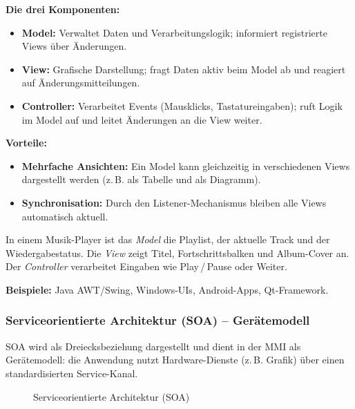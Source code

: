 \documentclass[12pt, a4paper]{article}
\begin{document}
\textbf{Die drei Komponenten:}
\begin{itemize}
  \item \textbf{Model:} Verwaltet Daten und Verarbeitungslogik; informiert
        registrierte Views über Änderungen.
  \item \textbf{View:} Grafische Darstellung; fragt Daten aktiv beim Model ab
        und reagiert auf Änderungsmitteilungen.
  \item \textbf{Controller:} Verarbeitet Events (Mausklicks, Tastatureingaben);
        ruft Logik im Model auf und leitet Änderungen an die View weiter.
\end{itemize}

\textbf{Vorteile:}
\begin{itemize}
  \item \textbf{Mehrfache Ansichten:} Ein Model kann gleichzeitig in verschiedenen
        Views dargestellt werden (z.\,B. als Tabelle und als Diagramm).
  \item \textbf{Synchronisation:} Durch den Listener-Mechanismus bleiben alle
        Views automatisch aktuell.
\end{itemize}

\begin{examplebox}
  In einem Musik-Player ist das \textit{Model} die Playlist, der aktuelle Track und
  der Wiedergabestatus. Die \textit{View} zeigt Titel, Fortschrittsbalken und
  Album-Cover an. Der \textit{Controller} verarbeitet Eingaben wie Play\,/\,Pause
  oder Weiter.
\end{examplebox}

\textbf{Beispiele:} Java AWT/Swing, Windows-UIs, Android-Apps, Qt-Framework.

\subsubsection{Serviceorientierte Architektur (SOA) -- Gerätemodell}

SOA wird als Dreiecksbeziehung dargestellt und dient in der MMI als Gerätemodell:
die Anwendung nutzt Hardware-Dienste (z.\,B. Grafik) über einen standardisierten
Service-Kanal.

\begin{figure}[H]
\centering
{}
\caption{Serviceorientierte Architektur (SOA)}
\end{figure}
\end{document}
